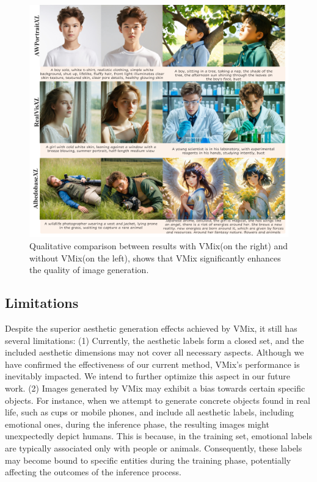 \begin{figure}[t]
\centering
\includegraphics[scale=0.995]{sup7.pdf}
    \caption{Qualitative comparison between results with VMix(on the right) and without VMix(on the left), shows that VMix significantly enhances the quality of image generation.}
    \label{Figure 106}
\end{figure}


\subsection{Limitations}
\label{Limitations}
Despite the superior aesthetic generation effects achieved by VMix, it still has several limitations: (1) Currently, the aesthetic labels form a closed set, and the included aesthetic dimensions may not cover all necessary aspects. Although we have confirmed the effectiveness of our current method, VMix's performance is inevitably impacted. We intend to further optimize this aspect in our future work. (2) Images generated by VMix may exhibit a bias towards certain specific objects. For instance, when we attempt to generate concrete objects found in real life, such as cups or mobile phones, and include all aesthetic labels, including emotional ones, during the inference phase, the resulting images might unexpectedly depict humans. This is because, in the training set, emotional labels are typically associated only with people or animals. Consequently, these labels may become bound to specific entities during the training phase, potentially affecting the outcomes of the inference process.



